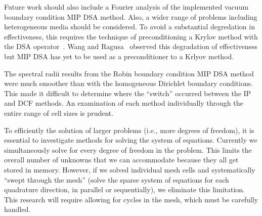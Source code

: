 \documentclass[12pt]{article}
\begin{document}
Future work should also include a Fourier analysis of the implemented vacuum boundary condition MIP DSA method. Also, a wider range of problems including heterogeneous media should be considered. To avoid a substantial degredation in effectiveness, this requires the technique of preconditioning a Krylov method with the DSA operator~\cite{WarsaKrylovDSA}. Wang and Ragusa~\cite{WangRagusaDSA} observed this degradation of effectiveness but MIP DSA has yet to be used as a preconditioner to a Krlyov method.

The spectral radii results from the Robin boundary condition MIP DSA method were much smoother than with the homogeneous Dirichlet boundary conditions. This made it difficult to determine where the ``switch'' occurred between the IP and DCF methods. An examination of each method individually through the entire range of cell sizes is prudent.

To efficiently the solution of larger problems (i.e., more degrees of freedom), it is essential to investigate methods for solving the system of equations. Currently we simultaneously solve for every degree of freedom in the problem. This limits the overall number of unknowns that we can accommodate because they all get stored in memory. However, if we solved individual mesh cells and systematically ``swept through the mesh'' (solve the sparse system of equations for each quadrature direction, in parallel or sequentially), we eliminate this limitation. This research will require allowing for cycles in the mesh, which must be carefully handled.

%
%
\end{document}
